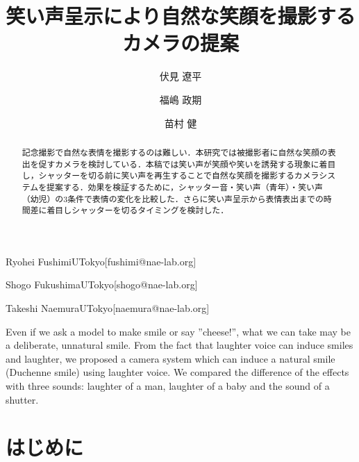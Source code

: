 \documentclass[submit,techreq]{ec2014}
\begin{document}
\title{笑い声呈示により自然な笑顔を撮影するカメラの提案}


\author{伏見 遼平}{Ryohei Fushimi}{UTokyo}[fushimi@nae-lab.org]
\author{福嶋 政期}{Shogo Fukushima}{UTokyo}[shogo@nae-lab.org]
\author{苗村 健}{Takeshi Naemura}{UTokyo}[naemura@nae-lab.org]

\begin{abstract}
記念撮影で自然な表情を撮影するのは難しい．本研究では被撮影者に自然な笑顔の表出を促すカメラを検討している．本稿では笑い声が笑顔や笑いを誘発する現象に着目し，シャッターを切る前に笑い声を再生することで自然な笑顔を撮影するカメラシステムを提案する．効果を検証するために，シャッター音・笑い声（青年）・笑い声（幼児）の3条件で表情の変化を比較した．さらに笑い声呈示から表情表出までの時間差に着目しシャッターを切るタイミングを検討した．
\end{abstract}


\begin{eabstract}Even if we ask a model to make smile or say ”cheese!”, what we can take may be a deliberate, unnatural smile. From the fact that laughter voice can induce smiles and laughter, we proposed a camera system which can induce a natural smile (Duchenne smile) using laughter voice. We compared the difference of the effects with three sounds: laughter of a man, laughter of a baby and the sound of a shutter. 
\end{eabstract}


\maketitle

\section{はじめに}
\end{document}
